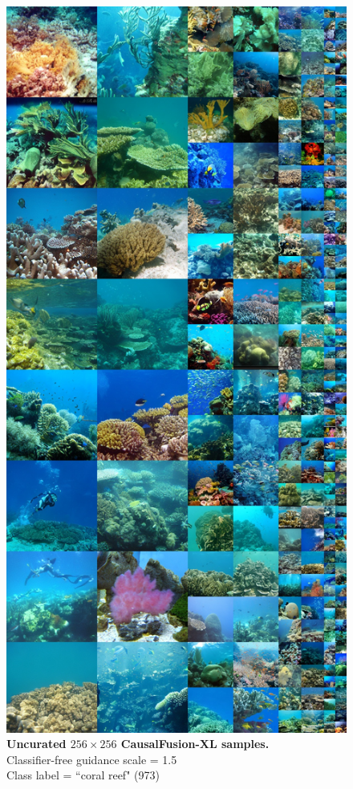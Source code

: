 \begin{figure}\centering
\includegraphics[width=\linewidth]{figs/xl256_973_cfg1.5.jpg}
\caption{\textbf{Uncurated $256\times256$ CausalFusion-XL samples.} \\Classifier-free guidance scale = 1.5\\Class label = ``coral reef" (973)}\vspace{-2mm}
\label{fig:samples256_6}
\end{figure}
